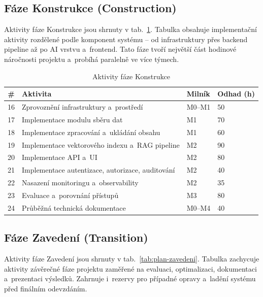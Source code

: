 \documentclass[a4paper, 11pt]{article}
\begin{document}
\subsection{Fáze Konstrukce (Construction)}

Aktivity fáze Konstrukce jsou shrnuty v tab.~\ref{tab:plan-konstrukce}.
Tabulka obsahuje implementační aktivity rozdělené podle komponent systému -- od infrastruktury přes backend pipeline až po AI vrstvu a~frontend. Tato fáze tvoří největší část hodinové náročnosti projektu a~probíhá paralelně ve více týmech.

\begin{table}[H]
\centering\small
\begin{tabularx}{\textwidth}{c X l l}
\toprule
\textbf{\#} & \textbf{Aktivita} & \textbf{Milník} & \textbf{Odhad (h)} \\
\midrule
16 & Zprovoznění infrastruktury a~prostředí & M0--M1 & 50 \\
17 & Implementace modulu sběru dat & M1 & 70 \\
18 & Implementace zpracování a~ukládání obsahu & M1 & 60 \\
19 & Implementace vektorového indexu a~RAG pipeline & M2 & 90 \\
20 & Implementace API a~UI & M2 & 80 \\
21 & Implementace autentizace, autorizace, auditování & M2 & 40 \\
22 & Nasazení monitoringu a~observability & M2 & 35 \\
23 & Evaluace a~porovnání přístupů & M3 & 80 \\
24 & Průběžná technická dokumentace & M0--M4 & 40 \\
\bottomrule
\end{tabularx}
\caption{Aktivity fáze Konstrukce}
\label{tab:plan-konstrukce}
\end{table}

\subsection{Fáze Zavedení (Transition)}

Aktivity fáze Zavedení jsou shrnuty v tab.~\ref{tab:plan-zavedeni}.
Tabulka zachycuje aktivity závěrečné fáze projektu zaměřené na evaluaci, optimalizaci, dokumentaci a~prezentaci výsledků. Zahrnuje i~rezervy pro případné opravy a~ladění systému před finálním odevzdáním.
\end{document}
